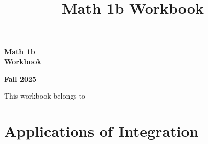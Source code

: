 \documentclass[letterpaper]{memoir}
\title{Math 1b Workbook}
\author{}
\def\chapterone{Applications of Integration}
\begin{document}
\begin{titlingpage}
\vspace*{1.5in} %

\begin{center}
    \fontsize{96pt}{108pt}\selectfont\sffamily%
    \textbf{Math 1b \\ Workbook} 
\end{center}

\vspace*{\fill}

\begin{center}
    \fontsize{48pt}{60pt}\selectfont\sffamily%
    \textbf{Fall 2025} 
\end{center}

\vspace*{\fill} %

\begin{center}
    \LARGE\sffamily %
    This workbook belongs to \underline{\hspace{10cm}} %
\end{center}

\end{titlingpage}

\pagestyle{empty}
\frontmatter

\tableofcontents*
\clearpage

\pagestyle{workbook}
\mainmatter

\chapter{\chapterone}
\clearpage






















\end{document}
